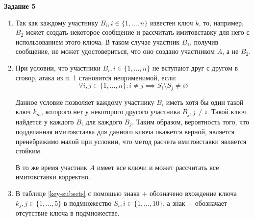 \documentclass[12pt, a4paper]{extarticle}
\newenvironment*{dummyenv}{}{}
\newcommand{\mysection}[1]{
    \addcontentsline{toc}{section}{#1}
    \begin{dummyenv}
        \bfseries\large #1
    \end{dummyenv}
}
\begin{document}
\mysection{Задание 5}

\begin{enumerate}
    \item Так как каждому участнику $B_i, i \in \{1, ..., n\}$ известен ключ $k$, то, например, 
    	$B_2$ может создать некоторое сообщение и рассчитать имитовставку для него с использованием 
    	этого ключа. В таком случае участник $B_1$, получив сообщение, не может удостовериться, что 
    	оно создано участником $A$, а не $B_2$.
        
    \item При условии, что участники $B_i, i \in \{1, ..., n\}$ не вступают друг с другом в сговор, 
    	атака из п. 1 становится неприменимой, если:
        \begin{equation}
            \forall i,j \in \{1,...,n\} : i \ne j \implies S_i \setminus S_j \ne \varnothing
            \label{6.2-condition}
        \end{equation}
        
        Данное условие позволяет каждому участнику $B_i$ иметь хотя бы один такой ключ $k_m$, 
        которого нет у некоторого другого участника $B_j, j \ne i$. Такой ключ найдется у каждого 
        $B_i$ для каждого $B_j$. Таким образом, вероятность того, что подделанная имитовставка для 
        данного ключа окажется верной, является пренебрежимо малой при условии, что метод расчета 
        имитовставки является стойким.
        
        В то же время участник $A$ имеет все ключи и может рассчитать все имитовставки корректно.
        
    \item В таблице \ref{key-subsets} с помощью знака $+$ обозначено вхождение ключа 
    	$k_j, j \in \{1, ..., 5\}$ в подмножество $S_i, i \in \{1, ..., 10\}$, а знак $-$ обозначает 
    	отсутствие ключа в подмножестве.
        

\end{enumerate}
\end{document}
